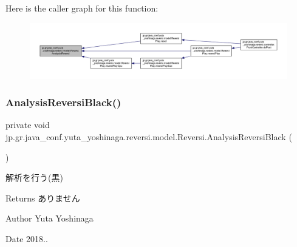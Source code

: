 Here is the caller graph for this function\+:
\nopagebreak
\begin{figure}[H]
\begin{center}
\leavevmode
\includegraphics[width=350pt]{classjp_1_1gr_1_1java__conf_1_1yuta__yoshinaga_1_1reversi_1_1model_1_1_reversi_a43098c043d0424bb5e5e60db358a324d_icgraph}
\end{center}
\end{figure}
\mbox{\label{classjp_1_1gr_1_1java__conf_1_1yuta__yoshinaga_1_1reversi_1_1model_1_1_reversi_adb74246f49150e02201766a1fa6cf732}} 
\subsubsection{\texorpdfstring{Analysis\+Reversi\+Black()}{AnalysisReversiBlack()}}
{\footnotesize\ttfamily private void jp.\+gr.\+java\+\_\+conf.\+yuta\+\_\+yoshinaga.\+reversi.\+model.\+Reversi.\+Analysis\+Reversi\+Black (\begin{DoxyParamCaption}{ }\end{DoxyParamCaption})\hspace{0.3cm}{\ttfamily [private]}}



解析を行う(黒) 

\begin{DoxyReturn}{Returns}
ありません 
\end{DoxyReturn}
\begin{DoxyAuthor}{Author}
Yuta Yoshinaga 
\end{DoxyAuthor}
\begin{DoxyDate}{Date}
2018.. 
\end{DoxyDate}


